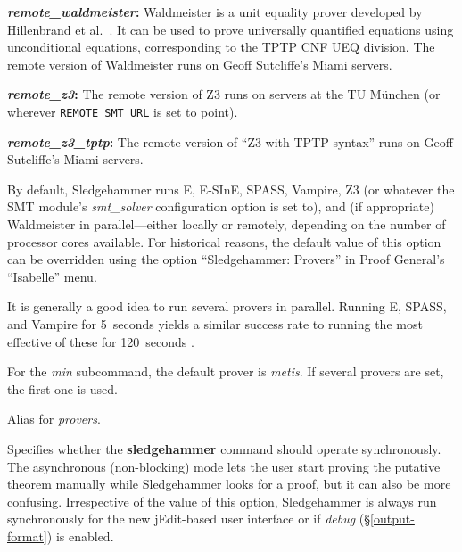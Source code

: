 \documentclass[a4paper,12pt]{article}
\begin{document}
\begin{enum}
\begin{enum}
\item[\labelitemi] \textbf{\textit{remote\_waldmeister}:} Waldmeister is a unit
equality prover developed by Hillenbrand et al.\ \cite{waldmeister}. It can be
used to prove universally quantified equations using unconditional equations,
corresponding to the TPTP CNF UEQ division. The remote version of Waldmeister
runs on Geoff Sutcliffe's Miami servers.

\item[\labelitemi] \textbf{\textit{remote\_z3}:} The remote version of Z3 runs on
servers at the TU M\"unchen (or wherever \texttt{REMOTE\_SMT\_URL} is set to
point).

\item[\labelitemi] \textbf{\textit{remote\_z3\_tptp}:} The remote version of ``Z3
with TPTP syntax'' runs on Geoff Sutcliffe's Miami servers.
\end{enum}

By default, Sledgehammer runs E, E-SInE, SPASS, Vampire, Z3 (or whatever
the SMT module's \textit{smt\_solver} configuration option is set to), and (if
appropriate) Waldmeister in parallel---either locally or remotely, depending on
the number of processor cores available. For historical reasons, the default
value of this option can be overridden using the option ``Sledgehammer:
Provers'' in Proof General's ``Isabelle'' menu.

It is generally a good idea to run several provers in parallel. Running E,
SPASS, and Vampire for 5~seconds yields a similar success rate to running the
most effective of these for 120~seconds \cite{boehme-nipkow-2010}.

For the \textit{min} subcommand, the default prover is \textit{metis}. If
several provers are set, the first one is used.

Alias for \textit{provers}.



Specifies whether the \textbf{sledgehammer} command should operate
synchronously. The asynchronous (non-blocking) mode lets the user start proving
the putative theorem manually while Sledgehammer looks for a proof, but it can
also be more confusing. Irrespective of the value of this option, Sledgehammer
is always run synchronously for the new jEdit-based user interface or if
\textit{debug} (\S\ref{output-format}) is enabled.


\end{enum}
\end{document}
